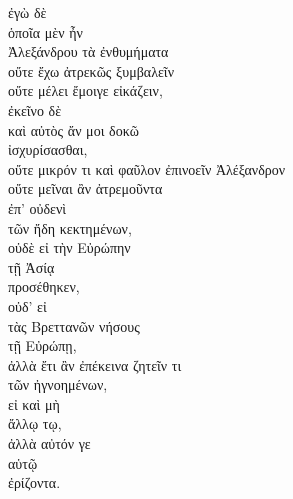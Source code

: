 {\large
\begin{greek}
\noindent  ἐγὼ δὲ \\
\tabto{2em} ὁποῖα μὲν ἦν \\

\tabto{4em} Ἀλεξάνδρου τὰ ἐνθυμήματα \\
οὔτε ἔχω ἀτρεκῶς ξυμβαλεῖν \\
οὔτε μέλει ἔμοιγε εἰκάζειν, \\
\tabto{2em} ἐκεῖνο δὲ \\
\tabto{2em} καὶ αὐτὸς ἄν μοι δοκῶ \\
\tabto{4em} ἰσχυρίσασθαι, \\
\tabto{4em} οὔτε μικρόν τι καὶ φαῦλον ἐπινοεῖν Ἀλέξανδρον \\
\tabto{4em} οὔτε μεῖναι ἂν ἀτρεμοῦντα \\
\tabto{6em} ἐπ' οὐδενὶ \\
\tabto{8em} τῶν ἤδη κεκτημένων, \\
\tabto{4em} οὐδὲ εἰ τὴν Εὐρώπην \\
\tabto{6em} τῇ Ἀσίᾳ \\
\tabto{4em} προσέθηκεν, \\
\tabto{4em} οὐδ' εἰ \\
\tabto{4em} τὰς Βρεττανῶν νήσους \\
\tabto{6em} τῇ Εὐρώπῃ, \\
\tabto{4em} ἀλλὰ ἔτι ἂν ἐπέκεινα ζητεῖν τι \\
\tabto{6em} τῶν ἠγνοημένων, \\
\tabto{4em} εἰ καὶ μὴ \\
\tabto{6em} ἄλλῳ τῳ, \\
\tabto{4em} ἀλλὰ αὐτόν γε \\
\tabto{6em} αὑτῷ \\
\tabto{4em} ἐρίζοντα.\\

\end{greek}
}

